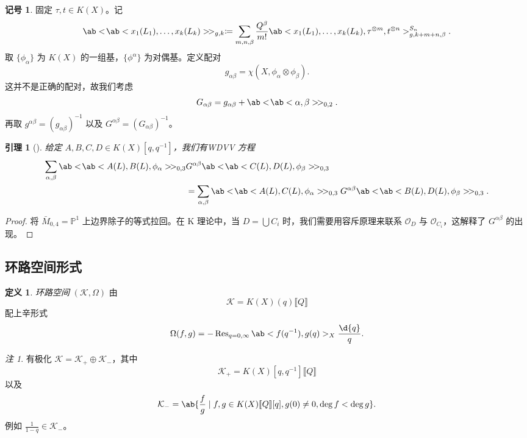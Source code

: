 \documentclass{amsart}
\newtheorem{lem}[thm]{引理}
\theoremstyle{definition}
\newtheorem{defn}[thm]{定义}
\newtheorem{notn}[thm]{记号}
\theoremstyle{remark}
\newtheorem{rmk}[thm]{注}
\theoremstyle{plain}
\theoremstyle{definition}
\theoremstyle{remark}
\renewcommand{\P}{\mathbb{P}}
\newcommand{\mc}[1]{\mathcal{#1}}
\newcommand{\on}[1]{\operatorname{#1}}
\newcommand{\1}{\mathbf{1}}
\newcommand{\2}{\mathbf{2}}
\newcommand{\3}{\mathbf{3}}
\newcommand{\ps}[1]{\llbracket #1 \rrbracket}
\begin{document}
\begin{notn}
    固定 \(\tau, t \in K(X)\)。记
    \[ \ab<\!\ab<x_1(L_1), \ldots, x_k(L_k)>\!>_{g,k} \coloneqq \sum_{m,n,\beta} \frac{Q^{\beta}}{m!} \ab<x_1(L_1), \ldots, x_k(L_k), \tau^{\otimes m}, t^{\otimes n}>_{g,k+m+n,\beta}^{S_n}. \]
    取 \(\{\phi_{\alpha}\}\) 为 \(K(X)\) 的一组基，\(\{\phi^{\alpha}\}\) 为对偶基。定义配对
    \[ g_{\alpha\beta} = \chi(X, \phi_{\alpha} \otimes \phi_{\beta}). \]
    这并不是正确的配对，故我们考虑
    \[ G_{\alpha\beta} = g_{\alpha\beta} + \ab<\!\ab<\alpha,\beta>\!>_{0,2}. \]
    再取 \(g^{\alpha\beta} = (g_{\alpha\beta})^{-1}\) 以及 \(G^{\alpha\beta} = (G_{\alpha\beta})^{-1}\)。
\end{notn}

\begin{lem}[{\cite{Givental2000K}}]
    给定 \(A,B,C,D \in K(X)[q,q^{-1}]\)，我们有\textit{WDVV 方程}
    \begin{align*}
        \sum_{\alpha,\beta} \ab<\!\ab< A(L), B(L), \phi_{\alpha}>\! >_{0,3}& G^{\alpha\beta}\ab<\!\ab< C(L), D(L), \phi_{\beta}>\! >_{0,3} \\
        &= \sum_{\alpha,\beta} \ab<\!\ab< A(L), C(L), \phi_{\alpha}>\! >_{0,3} G^{\alpha\beta}\ab<\!\ab< B(L), D(L), \phi_{\beta}>\! >_{0,3}. 
    \end{align*}
\end{lem}

\begin{proof}
    将 \(\bar{M}_{0,4} = \P^1\) 上边界除子的等式拉回。在 K 理论中，当 \(D = \bigcup C_i\) 时，我们需要用容斥原理来联系 \(\mc{O}_D\) 与 \(\mc{O}_{C_i}\)，这解释了 \(G^{\alpha\beta}\) 的出现。
\end{proof}

\subsection{环路空间形式}%
\label{sub:Loop space formalism}

\begin{defn}
    \textit{环路空间} \((\mc{K}, \Omega)\) 由
    \[ \mc{K} = K(X)(q) \ps{Q}\]
    配上辛形式
    \[ \Omega(f, g) = - \on{Res}_{q = 0, \infty} \ab<f(q^{-1}), g(q)>_X \frac{\d{q}}{q}. \]
\end{defn}

\begin{rmk}
    有极化 \(\mc{K} = \mc{K}_+ \oplus \mc{K}_-\)，其中
    \[ \mc{K}_+ = K(X)[q, q^{-1}]\ps{Q} \]
    以及
    \[ \mc{K}_- = \ab\{ \frac{f}{g} \mid f, g \in K(X)\ps{Q}[q], g(0) \neq 0, \deg f < \deg g\}. \]
    例如 \(\frac{1}{1-q} \in \mc{K}_-\)。
\end{rmk}
\end{document}
